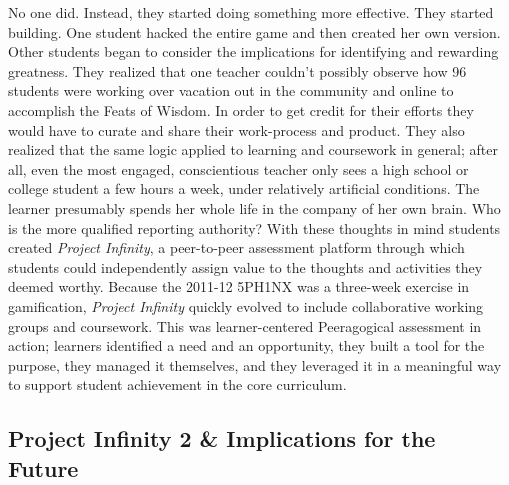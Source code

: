 No one did. Instead, they started doing something more effective. They
started building. One student hacked the entire game and then created
her own version. Other students began to consider the implications for
identifying and rewarding greatness. They realized that one teacher
couldn't possibly observe how 96 students were working over vacation out
in the community and online to accomplish the Feats of Wisdom. In order
to get credit for their efforts they would have to curate and share
their work-process and product. They also realized that the same logic
applied to learning and coursework in general; after all, even the most
engaged, conscientious teacher only sees a high school or college
student a few hours a week, under relatively artificial conditions. The
learner presumably spends her whole life in the company of her own
brain. Who is the more qualified reporting authority? With these
thoughts in mind students created \emph{Project Infinity}, a
peer-to-peer assessment platform through which students could
independently assign value to the thoughts and activities they deemed
worthy. Because the 2011-12 5PH1NX was a three-week exercise in
gamification, \emph{Project Infinity} quickly evolved to include
collaborative working groups and coursework. This was learner-centered
Peeragogical assessment in action; learners identified a need and an
opportunity, they built a tool for the purpose, they managed it
themselves, and they leveraged it in a meaningful way to support student
achievement in the core curriculum.

\subsection{Project Infinity 2 \& Implications for the
Future}\label{project-infinity-2-implications-for-the-future}

